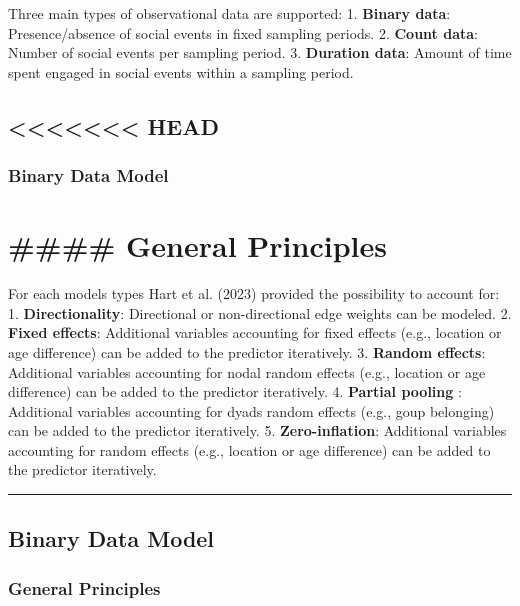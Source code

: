 \documentclass[
  letterpaper,
  DIV=11,
  numbers=noendperiod]{scrartcl}
\begin{document}
Three main types of observational data are supported: 1. \textbf{Binary
data}: Presence/absence of social events in fixed sampling periods. 2.
\textbf{Count data}: Number of social events per sampling period. 3.
\textbf{Duration data}: Amount of time spent engaged in social events
within a sampling period.

\subsection{\textless\textless\textless\textless\textless\textless\textless{}
HEAD}\label{head}

\subsubsection{Binary Data Model}\label{binary-data-model}

\section{\#\#\#\# General Principles}\label{general-principles-2}

For each models types Hart et al. (2023) provided the possibility to
account for: 1. \textbf{Directionality}: Directional or non-directional
edge weights can be modeled. 2. \textbf{Fixed effects}: Additional
variables accounting for fixed effects (e.g., location or age
difference) can be added to the predictor iteratively. 3. \textbf{Random
effects}: Additional variables accounting for nodal random effects
(e.g., location or age difference) can be added to the predictor
iteratively. 4. \textbf{Partial pooling} : Additional variables
accounting for dyads random effects (e.g., goup belonging) can be added
to the predictor iteratively. 5. \textbf{Zero-inflation}: Additional
variables accounting for random effects (e.g., location or age
difference) can be added to the predictor iteratively.

\begin{center}\rule{0.5\linewidth}{0.5pt}\end{center}

\subsection{Binary Data Model}\label{binary-data-model-1}

\subsubsection{General Principles}\label{general-principles-3}
\end{document}
